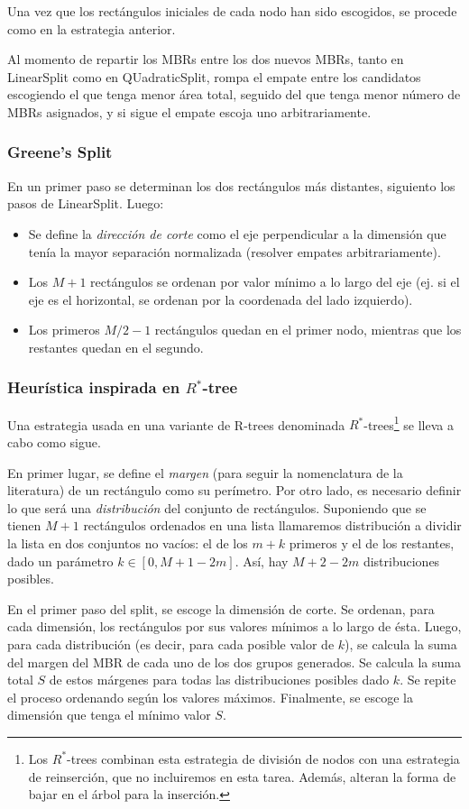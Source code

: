 \documentclass[dcc,uchile]{fcfmcourse}
\begin{document}
Una vez que los rectángulos iniciales de cada nodo han sido escogidos, se procede como en la estrategia anterior.

Al momento de repartir los MBRs entre los dos nuevos MBRs, tanto en LinearSplit como en QUadraticSplit, rompa el empate entre los candidatos escogiendo el que tenga menor área total, seguido del que tenga menor número de MBRs asignados, y si sigue el empate escoja uno arbitrariamente.
\subsubsection{Greene's Split}
En un primer paso se determinan los dos rectángulos más distantes, siguiento los pasos de LinearSplit. Luego:
\begin{itemize}
    \item Se define la \textit{dirección de corte} como el eje perpendicular a la dimensión que tenía la mayor separación normalizada (resolver empates arbitrariamente).
    \item Los $M+1$ rectángulos se ordenan por valor mínimo a lo largo del eje (ej. si el eje es el horizontal, se ordenan por la coordenada del lado izquierdo).
    \item Los primeros $M/2-1$ rectángulos quedan en el primer nodo, mientras que los restantes quedan en el segundo.
\end{itemize}
\subsubsection{Heurística inspirada en $R^*$-tree}
Una estrategia usada en una variante de R-trees denominada $R^*$-trees\footnote{Los $R^*$-trees combinan esta estrategia de división de nodos con una estrategia de reinserción, que no incluiremos en esta tarea. Además, alteran la forma de bajar en el árbol para la inserción.} se lleva a cabo como sigue.

En primer lugar, se define el \textit{margen} (para seguir la nomenclatura de la literatura) de un rectángulo como su perímetro. Por otro lado, es necesario definir lo que será una \textit{distribución} del conjunto de rectángulos. Suponiendo que se tienen $M+1$ rectángulos ordenados en una lista llamaremos distribución a dividir la lista en dos conjuntos no vacíos: el de los $m+k$ primeros y el de los restantes, dado un parámetro $k\in[0,M+1-2m]$. Así, hay $M+2-2m$ distribuciones posibles.

En el primer paso del split, se escoge la dimensión de corte. Se ordenan, para cada dimensión, los rectángulos por sus valores mínimos a lo largo de ésta. Luego, para cada distribución (es decir, para cada posible valor de $k$), se calcula la suma del margen del MBR de cada uno de los dos grupos generados. Se calcula la suma total $S$ de estos márgenes para todas las distribuciones posibles dado $k$. Se repite el proceso ordenando según los valores máximos. Finalmente, se escoge la dimensión que tenga el mínimo valor $S$.
\end{document}
